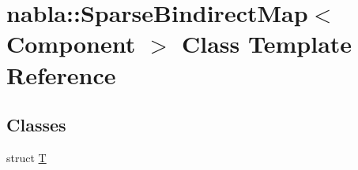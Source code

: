 \hypertarget{classnabla_1_1_sparse_bindirect_map}{}\section{nabla\+::Sparse\+Bindirect\+Map$<$ Component $>$ Class Template Reference}
\label{classnabla_1_1_sparse_bindirect_map}
\subsection*{Classes}
\begin{DoxyCompactItemize}
\item 
struct \mbox{\hyperlink{structnabla_1_1_sparse_bindirect_map_1_1_t}{T}}
\end{DoxyCompactItemize}
